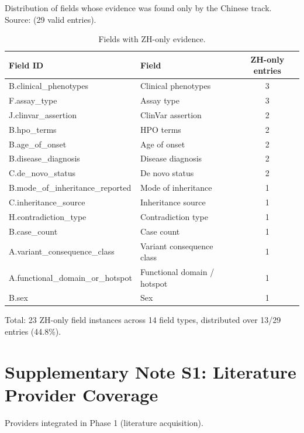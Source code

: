 \documentclass[12pt]{article}
\begin{document}
Distribution of fields whose evidence was found only by the Chinese
track. Source:  (29 valid
entries).

\begin{table}[htbp]
  \centering
  \caption{Fields with ZH-only evidence.}
  \label{tab:s2}
  \small
  \begin{tabular}{@{}llc@{}}
    \toprule
    \textbf{Field ID} & \textbf{Field} & \textbf{ZH-only entries} \\
    \midrule
    B.clinical\_phenotypes & Clinical phenotypes & 3 \\
    F.assay\_type & Assay type & 3 \\
    J.clinvar\_assertion & ClinVar assertion & 2 \\
    B.hpo\_terms & HPO terms & 2 \\
    B.age\_of\_onset & Age of onset & 2 \\
    B.disease\_diagnosis & Disease diagnosis & 2 \\
    C.de\_novo\_status & De novo status & 2 \\
    B.mode\_of\_inheritance\_reported & Mode of inheritance & 1 \\
    C.inheritance\_source & Inheritance source & 1 \\
    H.contradiction\_type & Contradiction type & 1 \\
    B.case\_count & Case count & 1 \\
    A.variant\_consequence\_class & Variant consequence class & 1 \\
    A.functional\_domain\_or\_hotspot & Functional domain / hotspot & 1 \\
    B.sex & Sex & 1 \\
    \bottomrule
  \end{tabular}
\end{table}

Total: 23 ZH-only field instances across 14 field types, distributed over
13/29 entries (44.8\%).

\clearpage

\section*{Supplementary Note S1: Literature Provider Coverage}

Providers integrated in Phase 1 (literature acquisition).
\end{document}
